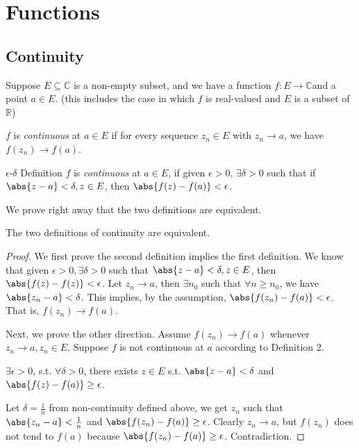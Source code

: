 \section{Functions}
\subsection{Continuity}
Suppose \(E \subseteq \mathbb{C}\) is a non-empty subset, and we have a function \(f: E \to \mathbb{C}\)and a point \(a \in E\). (this includes the case in which \(f\) is real-valued and \(E\) is a subset of \(\mathbb{R}\))
\begin{definition}{}{}
    \(f\) is \textit{continuous}  at \(a \in E\) if for every sequence \(z_n \in E\) with \(z_n \to a\), we have \(f(z_n) \to f(a)\).
\end{definition}
\begin{definition}{\(\epsilon\)-\(\delta\) Definition}{}
    \(f\) is \textit{continuous} at \(a \in E\), if given \(\epsilon > 0\), \(\exists \delta>0\) such that if \(\abs{z-a} <\delta, z \in E\), then \(\abs{f(z) - f(a)} < \epsilon\).
\end{definition}
We prove right away that the two definitions are equivalent.
\begin{theorem}{}{}
    The two definitions of continuity are equivalent.
\end{theorem}
\begin{proof}
    We first prove the second definition implies the first definition. We know that given \(\epsilon>0, \exists \delta>0\) such that \(\abs{z - a} < \delta, z \in E\), then \(\abs{f(z) - f(z)} < \epsilon\). Let \(z_n \to a\), then \(\exists n_0\) such that \(\forall n \geq n_0\), we have \(\abs{z_n - a} < \delta\). This implies, by the assumption, \(\abs{f(z_n) - f(a)} < \epsilon\). That is, \(f(z_n) \to f(a)\).

    Next, we prove the other direction. Assume \(f(z_n)\to f(a)\) whenever \(z_n \to a, z_n \in E\). Suppose \(f\) is not continuous at \(a\) according to Definition 2.

    \(\exists \epsilon>0\), s.t. \(\forall \delta>0\), there exists \(z\in E\) s.t. \(\abs{z-a} < \delta\) and \(\abs{f(z) -f(a)} \geq \epsilon\).

    Let \(\delta=\frac{1}{n}\) from non-continuity defined above, we get \(z_n\) such that \(\abs{z_n - a} <\frac{1}{n}\) and \(\abs{f(z_n) - f(a)} \geq \epsilon\). Clearly \(z_n \to a\), but \(f(z_n)\) does not tend to \(f(a)\) because \(\abs{f(z_n) - f(a)} \geq \epsilon\). Contradiction.
\end{proof}
